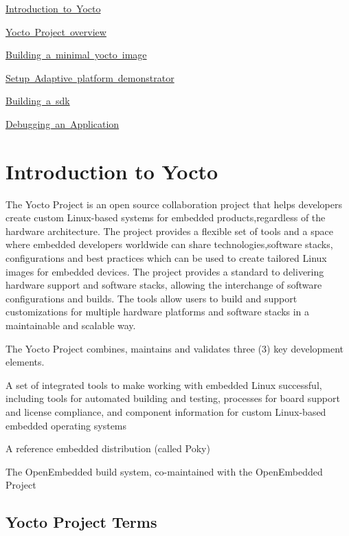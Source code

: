 
\begin{DoxyItemize}
\item \mbox{\hyperlink{yocto_introduction}{Introduction to Yocto}}
\item \mbox{\hyperlink{yocto_intro}{Yocto Project overview}}
\item \mbox{\hyperlink{asrbuild_introduction}{Building a minimal yocto image}}
\item \mbox{\hyperlink{adaptive_application}{Setup Adaptive platform demonstrator}}
\item \mbox{\hyperlink{sdk_introduction}{Building a sdk}}
\item \mbox{\hyperlink{gdb_yoctoimage}{Debugging an Application}} 
\end{DoxyItemize}\hypertarget{yocto_introduction}{}\section{Introduction to Yocto}\label{yocto_introduction}
The Yocto Project is an open source collaboration project that helps developers create custom Linux-\/based systems for embedded products,regardless of the hardware architecture. The project provides a flexible set of tools and a space where embedded developers worldwide can share technologies,software stacks, configurations and best practices which can be used to create tailored Linux images for embedded devices. The project provides a standard to delivering hardware support and software stacks, allowing the interchange of software configurations and builds. The tools allow users to build and support customizations for multiple hardware platforms and software stacks in a maintainable and scalable way.

The Yocto Project combines, maintains and validates three (3) key development elements.
\begin{DoxyItemize}
\item A set of integrated tools to make working with embedded Linux successful, including tools for automated building and testing, processes for board support and license compliance, and component information for custom Linux-\/based embedded operating systems
\item A reference embedded distribution (called Poky)
\item The Open\+Embedded build system, co-\/maintained with the Open\+Embedded Project
\end{DoxyItemize}

\subsection*{Yocto Project Terms}

